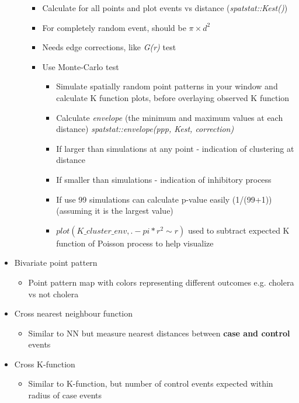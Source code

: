 \documentclass{article}
\begin{document}
\begin{itemize}
\begin{itemize}
\begin{itemize}
            \item Calculate for all points and plot events vs distance (\textit{spatstat::Kest()})
            \item For completely random event, should be $\pi \times d^2$
            \item Needs edge corrections, like \textit{G(r)} test
            \item Use Monte-Carlo test
            \begin{itemize}
                \item Simulate spatially random point patterns in your window and calculate K function plots, before overlaying observed K function
                \item Calculate \textit{envelope} (the minimum and maximum values at each distance) \textit{spatstat::envelope(ppp, Kest, correction)}
                \item If larger than simulations at any point - indication of clustering at distance
                \item If smaller than simulations - indication of inhibitory process
                \item If use 99 simulations can calculate p-value easily (1/(99+1)) (assuming it is the largest value)
                \item $plot(K\_cluster\_env, . - pi * r^2 \sim r)$ used to subtract expected K function of Poisson process to help visualize
            \end{itemize}
        \end{itemize}
    \end{itemize}
    \item Bivariate point pattern
    \begin{itemize}
        \item Point pattern map with colors representing different outcomes e.g. cholera vs not cholera
    \end{itemize}
    \item Cross nearest neighbour function
    \begin{itemize}
        \item Similar to NN but measure nearest distances between \textbf{case and control} events
    \end{itemize}
    \item Cross K-function
    \begin{itemize}
        \item Similar to K-function, but number of control events expected within radius of case events

\end{itemize}
\end{itemize}
\end{document}
